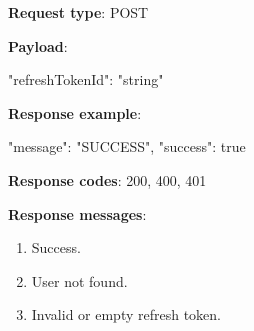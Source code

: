 \begin{itemize}
    \textbf{Request type}: POST

    \textbf{Payload}:

    \begin{spverbatim}
    {
        "refreshTokenId": "string"
    }
    \end{spverbatim}

    \textbf{Response example}:

    \begin{spverbatim}
    {
        "message": "SUCCESS",
        "success": true
    }
    \end{spverbatim}

    \textbf{Response codes}: 200, 400, 401

    \textbf{Response messages}:
    \begin{enumerate}
        \item Success.
        \item User not found.
        \item Invalid or empty refresh token.
    \end{enumerate}

\end{itemize}

